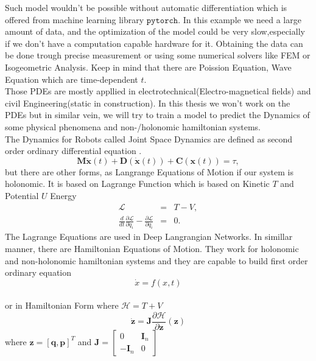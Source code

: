 Such model wouldn't be possible without automatic differentiation\cite{autodiff} which is offered from machine learning library $\texttt{pytorch}$\cite{pytorch}. In this example we need a large amount of data, and the optimization of the model could be very slow,especially if we don't have a computation capable hardware for it. Obtaining the data can be done trough precise measurement or using some numerical solvers like FEM\cite{fem} or Isogeometric Analysis\cite{iga}. Keep in mind that there are Poission Equation, Wave Equation which are time-dependent $t$.\\
Those PDEs are mostly appllied in electrotechnical(Electro-magnetical fields) and  civil Engineering(static in construction).
In this thesis we won't work on the PDEs but in similar vein, we will try to train a model to predict the Dynamics of some physical phenomena and non-/holonomic hamiltonian systems.\\
The Dynamics for Robots called Joint Space Dynamics are defined as second order ordinary differential equation\cite{jointspace} .
\begin{equation}
	\mathbf{M}\ddot{\mathbf{x}}(t) + \mathbf{D}(\dot{\mathbf{x}}(t)) + \mathbf{C}(\mathbf{x}(t))=\tau,
\end{equation} but there are other forms, as Langrange Equations of Motion if our system is holonomic\cite{holo}. It is based on Lagrange Function which is based on Kinetic $T$ and Potential $U$ Energy
\begin{eqnarray}
	\mathcal{L} &=& T - V,\\
	\frac{d}{dt}\frac{\partial \mathcal{L}}{\partial \dot{q}_i} - \frac{\partial \mathcal{L}}{\partial q_i}&=&0.
\end{eqnarray}   
The Lagrange Equations are used in Deep Langrangian Networks\cite{delan}. In simillar manner, there are Hamiltonian Equations of Motion.
They work for holonomic and non-holonomic hamiltonian systems and they are capable to build first order ordinary equation
\begin{equation}
	\dot{x} = f(x,t)
\end{equation} \\
or in Hamiltonian Form where $\mathcal{H} = T + V$
\begin{equation}
	\dot{\mathbf{z}} = \mathbf{J}\frac{\partial\mathcal{H}}{\partial \mathbf{z}}(\mathbf{z})
\end{equation} where $\mathbf{z}=[\mathbf{q},\mathbf{p}]^T$ and $\mathbf{J} = \begin{bmatrix}
0 & \mathbf{I}_n\\
-\mathbf{I}_n & 0
\end{bmatrix} $\\
